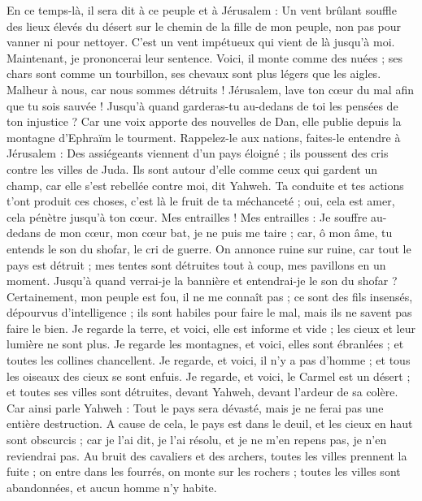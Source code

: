 \begin{multicols}{2}
En ce temps-là, il sera dit à ce peuple et à Jérusalem : Un vent brûlant souffle des lieux élevés du désert sur le chemin de la fille de mon peuple, non pas pour vanner ni pour nettoyer.
C'est un vent impétueux qui vient de là jusqu'à moi. Maintenant, je prononcerai leur sentence.
Voici, il monte comme des nuées ; ses chars sont comme un tourbillon, ses chevaux sont plus légers que les aigles. Malheur à nous, car nous sommes détruits !
Jérusalem, lave ton cœur du mal afin que tu sois sauvée ! Jusqu'à quand garderas-tu au-dedans de toi les pensées de ton injustice ?
Car une voix apporte des nouvelles de Dan, elle publie depuis la montagne d'Ephraïm le tourment.
Rappelez-le aux nations, faites-le entendre à Jérusalem : Des assiégeants viennent d'un pays éloigné ; ils poussent des cris contre les villes de Juda.
Ils sont autour d'elle comme ceux qui gardent un champ, car elle s'est rebellée contre moi, dit Yahweh.
Ta conduite et tes actions t'ont produit ces choses, c'est là le fruit de ta méchanceté ; oui, cela est amer, cela pénètre jusqu'à ton cœur.
Mes entrailles ! Mes entrailles : Je souffre au-dedans de mon cœur, mon cœur bat, je ne puis me taire ; car, ô mon âme, tu entends le son du shofar, le cri de guerre.
On annonce ruine sur ruine, car tout le pays est détruit ; mes tentes sont détruites tout à coup, mes pavillons en un moment.
Jusqu'à quand verrai-je la bannière et entendrai-je le son du shofar ?
Certainement, mon peuple est fou, il ne me connaît pas ; ce sont des fils insensés, dépourvus d'intelligence ; ils sont habiles pour faire le mal, mais ils ne savent pas faire le bien.
Je regarde la terre, et voici, elle est informe et vide ; les cieux et leur lumière ne sont plus.
Je regarde les montagnes, et voici, elles sont ébranlées ; et toutes les collines chancellent.
Je regarde, et voici, il n'y a pas d'homme ; et tous les oiseaux des cieux se sont enfuis.
Je regarde, et voici, le Carmel est un désert ; et toutes ses villes sont détruites, devant Yahweh, devant l'ardeur de sa colère.
Car ainsi parle Yahweh : Tout le pays sera dévasté, mais je ne ferai pas une entière destruction.
A cause de cela, le pays est dans le deuil, et les cieux en haut sont obscurcis ; car je l'ai dit, je l'ai résolu, et je ne m'en repens pas, je n'en reviendrai pas.
Au bruit des cavaliers et des archers, toutes les villes prennent la fuite ; on entre dans les fourrés, on monte sur les rochers ; toutes les villes sont abandonnées, et aucun homme n'y habite.

\end{multicols}
